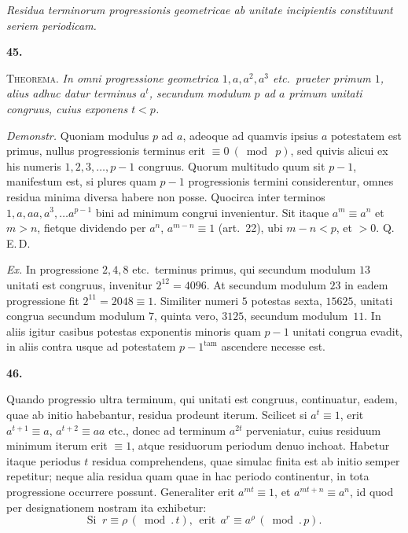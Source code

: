 \documentclass[12pt,a4paper]{article}
\begin{document}
\bigskip

\begin{center}
\textit{Residua terminorum progressionis geometricae ab unitate incipientis constituunt seriem periodicam.}
\end{center}

\medskip

\noindent\textbf{45.}

\medskip

\textsc{Theorema.} \textit{In omni progressione geometrica $1, a, a^{2}, a^{3}$ etc.\
praeter primum $1$, alius adhuc datur terminus $a^{t}$, secundum modulum $p$ ad $a$
primum unitati congruus, cuius exponens $t < p$.}

\medskip

\textit{Demonstr.} Quoniam modulus $p$ ad $a$, adeoque ad quamvis ipsius $a$
potestatem est primus, nullus progressionis terminus erit $\equiv 0\ (\bmod\ p)$, sed
quivis alicui ex his numeris $1, 2, 3, \ldots, p-1$ congruus. Quorum multitudo quum
sit $p - 1$, manifestum est, si plures quam $p - 1$ progressionis termini
considerentur, omnes residua minima diversa habere non posse. Quocirca inter terminos
$1, a, aa, a^{3}, \ldots a^{p-1}$ bini ad minimum congrui invenientur. Sit itaque
$a^{m} \equiv a^{n}$ et $m > n$, fietque dividendo per $a^{n}$,
$a^{m-n} \equiv 1$ (art.~22), ubi $m - n < p$, et $> 0$. Q.\,E.\,D.

\medskip

\textit{Ex.} In progressione $2, 4, 8$ etc.\ terminus primus, qui secundum modulum
$13$ unitati est congruus, invenitur $2^{12} = 4096$. At secundum modulum $23$ in
eadem progressione fit $2^{11} = 2048 \equiv 1$. Similiter numeri $5$ potestas sexta,
$15625$, unitati congrua secundum modulum $7$, quinta vero, $3125$, secundum
modulum~$11$. In aliis igitur casibus potestas exponentis minoris quam $p - 1$
unitati congrua evadit, in aliis contra usque ad potestatem $p - 1^{\text{tam}}$
ascendere necesse est.

\bigskip

\noindent\textbf{46.}

\medskip

Quando progressio ultra terminum, qui unitati est congruus, continuatur, eadem,
quae ab initio habebantur, residua prodeunt iterum. Scilicet si $a^{t} \equiv 1$,
erit $a^{t+1} \equiv a$, $a^{t+2} \equiv aa$ etc., donec ad terminum $a^{2t}$
perveniatur, cuius residuum minimum iterum erit $\equiv 1$, atque residuorum
periodum denuo inchoat. Habetur itaque periodus $t$ residua comprehendens, quae
simulac finita est ab initio semper repetitur; neque alia residua quam quae in hac
periodo continentur, in tota progressione occurrere possunt. Generaliter erit
$a^{mt} \equiv 1$, et $a^{mt+n} \equiv a^{n}$, id quod per designationem nostram ita
exhibetur:
\[
  \text{Si }\ r \equiv \rho\,(\bmod.\,t),\ \ \text{erit}\ \ a^{r} \equiv a^{\rho}\,(\bmod.\,p).
\]
\end{document}
